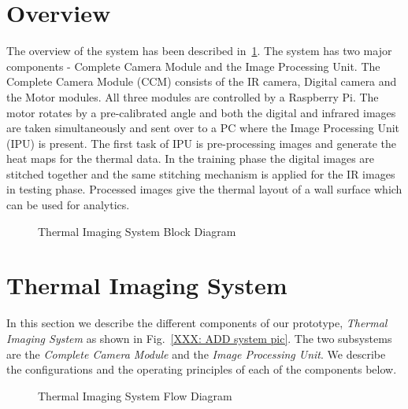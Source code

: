 \documentclass{sig-alternate}
\begin{document}
\section{Overview}

\indent The overview of the system has been described in~\ref{fig:Overview}. The system has two major components - Complete Camera Module and the Image Processing Unit. The Complete Camera Module (CCM) consists of the IR camera, Digital camera and the Motor modules. All three modules are controlled by a Raspberry Pi. The motor rotates by a pre-calibrated angle and both the digital and infrared images are taken simultaneously and sent over to a PC where the Image Processing Unit (IPU) is present. The first task of IPU is pre-processing images and generate the heat maps for the thermal data. In the training phase the digital images are stitched together and the same stitching mechanism is applied for the IR images in testing phase. Processed images give the thermal layout of a wall surface which can be used for analytics.

\begin{figure}[!h]
\begin{center}
\vspace{-.1in}
 \caption{Thermal Imaging System Block Diagram}
 \label{fig:Overview}
\end{center}
\end{figure}

\section{Thermal Imaging System}
In this section we describe the different components of our prototype, {\it Thermal Imaging System} as shown in Fig.~\ref{XXX: ADD system pic}. The two subsystems are the {\it Complete Camera Module} and the {\it Image Processing Unit}. We describe the configurations and the operating principles of each of the components below.
	\begin{figure}[!htb]
\begin{center}
 \caption{Thermal Imaging System Flow Diagram}
 \label{fig:Flow}
\end{center}
\end{figure}
	
	
\end{document}
